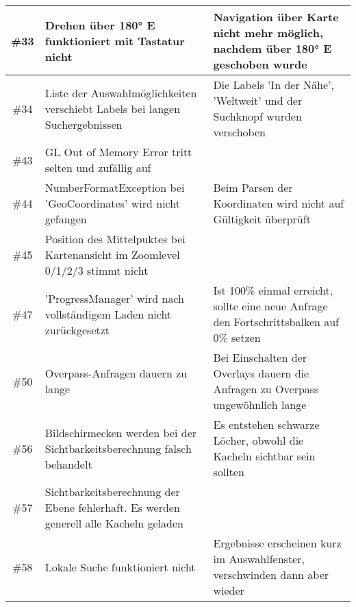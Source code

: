 \documentclass[10pt]{scrreprt}
\begin{document}
\begin{longtable}{|c|p{5.2cm}|p{8.2cm}|}
\hline
\#33 & Drehen über 180° E funktioniert mit Tastatur nicht & Navigation über Karte nicht mehr möglich, nachdem über 180° E geschoben wurde \\
\hline
\#34 & Liste der Auswahlmöglichkeiten verschiebt Labels bei langen Suchergebnissen & Die Labels 'In der Nähe', 'Weltweit' und der Suchknopf wurden verschoben \\
\hline
\#43 & GL Out of Memory Error tritt selten und zufällig auf & \\
\hline
\#44 & NumberFormatException bei 'GeoCoordinates' wird nicht gefangen & Beim Parsen der Koordinaten wird nicht auf Gültigkeit überprüft \\
\hline
\#45 & Position des Mittelpuktes bei Kartenansicht im Zoomlevel 0/1/2/3 stimmt nicht & \\
\hline
\#47 & 'ProgressManager' wird nach vollständigem Laden nicht zurückgesetzt & Ist 100\% einmal erreicht, sollte eine neue Anfrage den Fortschrittsbalken auf 0\% setzen \\
\hline
\#50 & Overpass-Anfragen dauern zu lange & Bei Einschalten der Overlays dauern die Anfragen zu Overpass ungewöhnlich lange \\
\hline
\#56 & Bildschirmecken werden bei der Sichtbarkeitsberechnung falsch behandelt & Es entstehen schwarze Löcher, obwohl die Kacheln sichtbar sein sollten \\
\hline
\#57 & Sichtbarkeitsberechnung der Ebene fehlerhaft. Es werden generell alle Kacheln geladen & \\
\hline
\#58 & Lokale Suche funktioniert nicht & Ergebnisse erscheinen kurz im Auswahlfenster, verschwinden dann aber wieder \\
\hline
\end{longtable}
\end{document}
